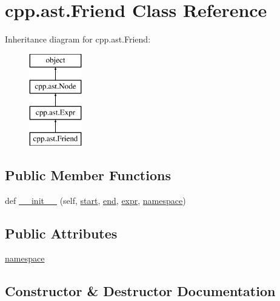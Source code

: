 \hypertarget{classcpp_1_1ast_1_1_friend}{}\section{cpp.\+ast.\+Friend Class Reference}
\label{classcpp_1_1ast_1_1_friend}
Inheritance diagram for cpp.\+ast.\+Friend\+:\begin{figure}[H]
\begin{center}
\leavevmode
\includegraphics[height=4.000000cm]{df/d5e/classcpp_1_1ast_1_1_friend}
\end{center}
\end{figure}
\subsection*{Public Member Functions}
\begin{DoxyCompactItemize}
\item 
def \mbox{\hyperlink{classcpp_1_1ast_1_1_friend_a9fe245d0f14eaab85435e942a56de7e6}{\+\_\+\+\_\+init\+\_\+\+\_\+}} (self, \mbox{\hyperlink{classcpp_1_1ast_1_1_node_a7b2aa97e6a049bb1a93aea48c48f1f44}{start}}, \mbox{\hyperlink{classcpp_1_1ast_1_1_node_a3c5e5246ccf619df28eca02e29d69647}{end}}, \mbox{\hyperlink{classcpp_1_1ast_1_1_expr_a2f4e13fb0176f2616f8703103c806462}{expr}}, \mbox{\hyperlink{classcpp_1_1ast_1_1_friend_a076c68dddae9bd1e24d224d005538014}{namespace}})
\end{DoxyCompactItemize}
\subsection*{Public Attributes}
\begin{DoxyCompactItemize}
\item 
\mbox{\hyperlink{classcpp_1_1ast_1_1_friend_a076c68dddae9bd1e24d224d005538014}{namespace}}
\end{DoxyCompactItemize}


\subsection{Constructor \& Destructor Documentation}
\mbox{\label{classcpp_1_1ast_1_1_friend_a9fe245d0f14eaab85435e942a56de7e6}} 
